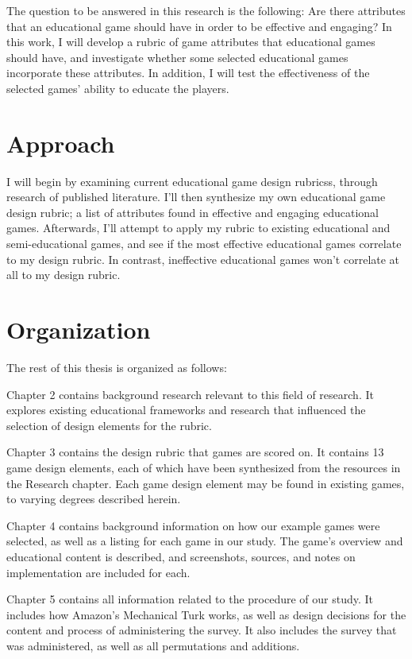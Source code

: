 \documentclass[12pt]{report}
\begin{document}
		The question to be answered in this research is the following: Are there attributes that an educational game should have in order to be effective and engaging? In this work, I will develop a rubric of game attributes that educational games should have, and investigate whether some selected educational games incorporate these attributes. In addition, I will test the effectiveness of the selected games' ability to educate the players.

	\section{Approach} 
		I will begin by examining current educational game design rubricss, through research of published literature. I'll then synthesize my own educational game design rubric; a list of attributes found in effective and engaging educational games. Afterwards, I'll attempt to apply my rubric to existing educational and semi-educational games, and see if the most effective educational games correlate to my design rubric. In contrast, ineffective educational games won't correlate at all to my design rubric.

	\section{Organization}
		The rest of this thesis is organized as follows:

		Chapter 2 contains background research relevant to this field of research. It explores existing educational frameworks and research that influenced the selection of design elements for the rubric.

		Chapter 3 contains the design rubric that games are scored on. It contains 13 game design elements, each of which have been synthesized from the resources in the Research chapter. Each game design element may be found in existing games, to varying degrees described herein.

		Chapter 4 contains background information on how our example games were selected, as well as a listing for each game in our study. The game's overview and educational content is described, and screenshots, sources, and notes on implementation are included for each.

		Chapter 5 contains all information related to the procedure of our study. It includes how Amazon's Mechanical Turk works, as well as design decisions for the content and process of administering the survey. It also includes the survey that was administered, as well as all permutations and additions.
\end{document}
